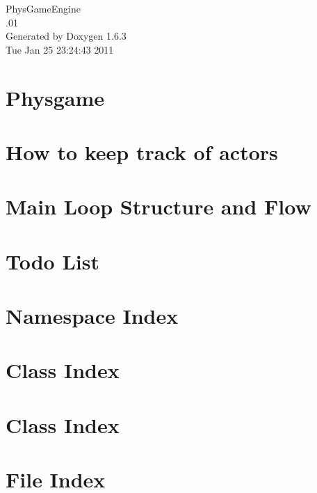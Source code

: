 \documentclass[a4paper]{book}
\begin{document}
\hypersetup{pageanchor=false}
\begin{titlepage}
\vspace*{7cm}
\begin{center}
{\Large PhysGameEngine \\[1ex]\large .01 }\\
\vspace*{1cm}
{\large Generated by Doxygen 1.6.3}\\
\vspace*{0.5cm}
{\small Tue Jan 25 23:24:43 2011}\\
\end{center}
\end{titlepage}
\clearemptydoublepage
{}
\tableofcontents
\clearemptydoublepage
{}
\hypersetup{pageanchor=true}
\chapter{Physgame}
\label{index}\hypertarget{index}{}
\chapter{How to keep track of actors}
\label{actorcontainer1}
\hypertarget{actorcontainer1}{}

\chapter{Main Loop Structure and Flow}
\label{mainloop1}
\hypertarget{mainloop1}{}

\chapter{Todo List}
\label{todo}
\hypertarget{todo}{}

\chapter{Namespace Index}

\chapter{Class Index}

\chapter{Class Index}

\chapter{File Index}

\end{document}

